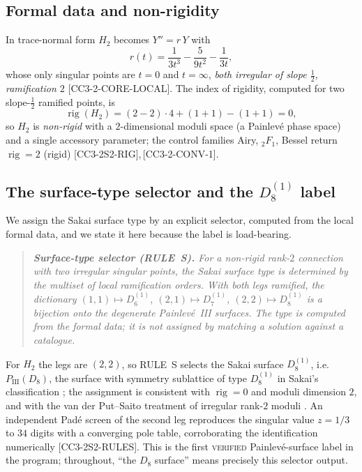 \documentclass[11pt,reqno]{amsart}
\theoremstyle{plain}
\theoremstyle{definition}
\theoremstyle{remark}
\DeclareMathOperator{\rig}{rig}
\newcommand{\Htwo}{H_{2}}
\newcommand{\claim}[1]{\textsf{\small[#1]}}
\newcommand{\PIII}{P_{\mathrm{III}}}
\begin{document}
\subsection{Formal data and non-rigidity}
In trace-normal form $\Htwo$ becomes $Y''=r\,Y$ with
\begin{equation}\label{eq:r}
  r(t)=\frac{1}{3t^{3}}-\frac{5}{9t^{2}}-\frac{1}{3t},
\end{equation}
whose only singular points are $t=0$ and $t=\infty$, \emph{both irregular of
slope $\tfrac12$, ramification $2$} \claim{CC3-2-CORE-LOCAL}. The index of
rigidity, computed for two slope-$\tfrac12$ ramified points, is
\begin{equation}\label{eq:rig}
  \rig(\Htwo)=(2-2)\cdot 4+(1+1)-(1+1)=0,
\end{equation}
so $\Htwo$ is \emph{non-rigid} with a $2$-dimensional moduli space (a Painlev\'e
phase space) and a single accessory parameter; the control families
Airy, ${}_{2}F_{1}$, Bessel return $\rig=2$ (rigid)
\claim{CC3-2S2-RIG},\,\claim{CC3-2-CONV-1}.

\subsection{The surface-type selector and the $D_{8}^{(1)}$ label}\label{sec:rules}
We assign the Sakai surface type by an explicit selector, computed from the
local formal data, and we state it here because the label is load-bearing.

\begin{quote}\small\itshape
\textbf{Surface-type selector (RULE~S).} For a non-rigid rank-$2$ connection
with two irregular singular points, the Sakai surface type is determined by the
multiset of local ramification orders. With both legs ramified, the dictionary
$(1,1)\mapsto D_{6}^{(1)}$, $(2,1)\mapsto D_{7}^{(1)}$,
$(2,2)\mapsto D_{8}^{(1)}$ is a bijection onto the degenerate Painlev\'e~III
surfaces. The type is computed from the formal data; it is not assigned by
matching a solution against a catalogue.
\end{quote}

For $\Htwo$ the legs are $(2,2)$, so RULE~S selects the Sakai surface
$D_{8}^{(1)}$, i.e.\ $\PIII(D_{8})$, the surface with symmetry sublattice of
type $D_{8}^{(1)}$ in Sakai's classification \cite{Sakai}; the assignment is
consistent with $\rig=0$ and moduli dimension $2$, and with the van der
Put--Saito treatment of irregular rank-$2$ moduli \cite{vdPutSaito}. An
independent Pad\'e screen of the second leg reproduces the singular value
$z=1/3$ to $34$ digits with a converging pole table, corroborating the
identification numerically \claim{CC3-2S2-RULES}. This is the first
\textsc{verified} Painlev\'e-surface label in the program; throughout, ``the
$D_{8}$ surface'' means precisely this selector output.
\end{document}
